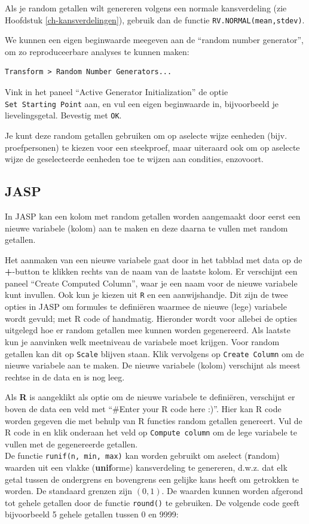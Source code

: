 \documentclass[
]{book}
\begin{document}
Als je random getallen wilt genereren volgens een normale kansverdeling (zie Hoofdstuk \ref{ch-kansverdelingen}), gebruik dan de functie \texttt{RV.NORMAL(mean,stdev)}.

We kunnen een eigen beginwaarde meegeven aan de ``random number generator'', om zo reproduceerbare analyses te kunnen maken:

\begin{verbatim}
Transform > Random Number Generators...
\end{verbatim}

Vink in het paneel ``Active Generator Initialization'' de optie \texttt{Set\ Starting\ Point} aan, en vul een eigen beginwaarde in, bijvoorbeeld je lievelingsgetal. Bevestig met \texttt{OK}.

Je kunt deze random getallen gebruiken om op aselecte wijze eenheden (bijv. proefpersonen) te kiezen voor een steekproef, maar uiteraard ook om op aselecte wijze de geselecteerde eenheden toe te wijzen aan condities, enzovoort.

\subsection{JASP}\label{jasp}

In JASP kan een kolom met random getallen worden aangemaakt door eerst een nieuwe variabele (kolom) aan te maken en deze daarna te vullen met random getallen.

Het aanmaken van een nieuwe variabele gaat door in het tabblad met data op de \textbf{+}-button te klikken rechts van de naam van de laatste kolom. Er verschijnt een paneel ``Create Computed Column'', waar je een naam voor de nieuwe variabele kunt invullen. Ook kun je kiezen uit \texttt{R} en een aanwijshandje. Dit zijn de twee opties in JASP om formules te definiëren waarmee de nieuwe (lege) variabele wordt gevuld; met R code of handmatig. Hieronder wordt voor allebei de opties uitgelegd hoe er random getallen mee kunnen worden gegenereerd. Als laatste kun je aanvinken welk meetniveau de variabele moet krijgen. Voor random getallen kan dit op \texttt{Scale} blijven staan. Klik vervolgens op \texttt{Create\ Column} om de nieuwe variabele aan te maken. De nieuwe variabele (kolom) verschijnt als meest rechtse in de data en is nog leeg.

Als \textbf{R} is aangeklikt als optie om de nieuwe variabele te definiëren, verschijnt er boven de data een veld met ``\#Enter your R code here :)''. Hier kan R code worden gegeven die met behulp van R functies random getallen genereert. Vul de R code in en klik onderaan het veld op \texttt{Compute\ column} om de lege variabele te vullen met de gegenereerde getallen.\\
De functie \texttt{runif(n,\ min,\ max)} kan worden gebruikt om aselect (\textbf{r}andom) waarden uit een vlakke (\textbf{unif}orme) kansverdeling te genereren, d.w.z. dat elk getal tussen de ondergrens en bovengrens een gelijke kans heeft om getrokken te worden. De standaard grenzen zijn \((0,1)\). De waarden kunnen worden afgerond tot gehele getallen door de functie \texttt{round()} te gebruiken. De volgende code geeft bijvoorbeeld 5 gehele getallen tussen 0 en 9999:
\end{document}
